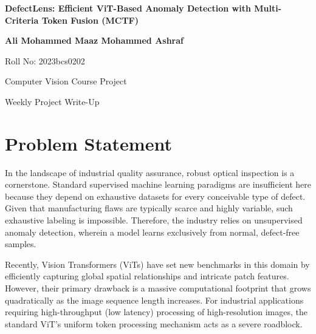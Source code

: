 \documentclass[12pt]{article}
\begin{document}
\begin{center}
    {\LARGE \textbf{DefectLens: Efficient ViT-Based Anomaly Detection with Multi-Criteria Token Fusion (MCTF)} \par}
    \vspace{0.5cm}
    {\large \textbf{Ali Mohammed Maaz Mohammed Ashraf} \par}
    {\large Roll No: 2023bcs0202 \par}
    {\large Computer Vision Course Project \par}
    {\large Weekly Project Write-Up \par}
    \vspace{0.5cm}
\end{center}

\begin{abstract}
\noindent This report establishes the core motivation and structural framework for the DefectLens anomaly detection system. It delves into the computational hurdles of employing Vision Transformers (ViTs) in high-resolution manufacturing inspection. Additionally, it highlights how integrating a Multi-Criteria Token Fusion (MCTF) approach can facilitate real-time edge processing, ultimately satisfying the critical objectives of maintaining superior defect detection accuracy while drastically cutting down operational latency.
\end{abstract}

\vspace{0.5cm}

\section{Problem Statement}
In the landscape of industrial quality assurance, robust optical inspection is a cornerstone. Standard supervised machine learning paradigms are insufficient here because they depend on exhaustive datasets for every conceivable type of defect. Given that manufacturing flaws are typically scarce and highly variable, such exhaustive labeling is impossible. Therefore, the industry relies on unsupervised anomaly detection, wherein a model learns exclusively from normal, defect-free samples.

Recently, Vision Transformers (ViTs) have set new benchmarks in this domain by efficiently capturing global spatial relationships and intricate patch features. However, their primary drawback is a massive computational footprint that grows quadratically as the image sequence length increases. For industrial applications requiring high-throughput (low latency) processing of high-resolution images, the standard ViT's uniform token processing mechanism acts as a severe roadblock.
\end{document}
